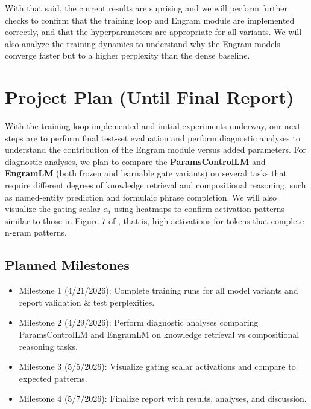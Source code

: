 \documentclass[11pt]{article}
\begin{document}
With that said, the current results are suprising and we will perform further checks to confirm that the training loop and Engram module are implemented correctly, and that the hyperparameters are appropriate for all variants. 
We will also analyze the training dynamics to understand why the Engram models converge faster but to a higher perplexity than the dense baseline.

\section{Project Plan (Until Final Report)}

With the training loop implemented and initial experiments underway, our next steps are to perform final test-set evaluation
and perform diagnostic analyses to understand the contribution of the Engram module versus added parameters. For diagnostic analyses, we plan to 
compare the \textbf{ParamsControlLM} and \textbf{EngramLM} (both frozen and learnable gate variants) on several tasks that require different degrees of knowledge retrieval and compositional reasoning,
such as named-entity prediction and formulaic phrase completion. We will also visualize the gating scalar $\alpha_t$ using heatmaps to confirm activation patterns similar to those in Figure 7 of \cite{cheng2026engram}, that is,
high activations for tokens that complete n-gram patterns.

\subsection{Planned Milestones}
\begin{itemize}
	\item Milestone 1 (4/21/2026): Complete training runs for all model variants and report validation \& test perplexities.
	\item Milestone 2 (4/29/2026): Perform diagnostic analyses comparing ParamsControlLM and EngramLM on knowledge retrieval vs compositional reasoning tasks.
	\item Milestone 3 (5/5/2026): Visualize gating scalar activations and compare to expected patterns.
	\item Milestone 4 (5/7/2026): Finalize report with results, analyses, and discussion.
\end{itemize}



\end{document}
